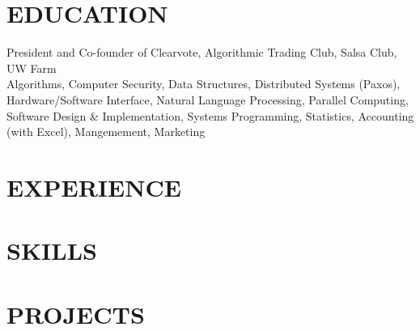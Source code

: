 \documentclass[11pt,letterpaper]{article}
\begin{document}

\section{\faGraduationCap{ }EDUCATION}

President and Co-founder of Clearvote, Algorithmic Trading Club, Salsa Club, UW Farm \\
Algorithms, Computer Security, Data Structures, Distributed Systems (Paxos), Hardware/Software
Interface, Natural Language Processing, Parallel Computing, Software Design \& Implementation, Systems Programming,
Statistics, Accounting (with Excel), Mangemement, Marketing \\

\section{\faCode{ }EXPERIENCE}





\section{\faDatabase{ }SKILLS}


\section{\faFolderOpen{ }PROJECTS}




\end{document}
